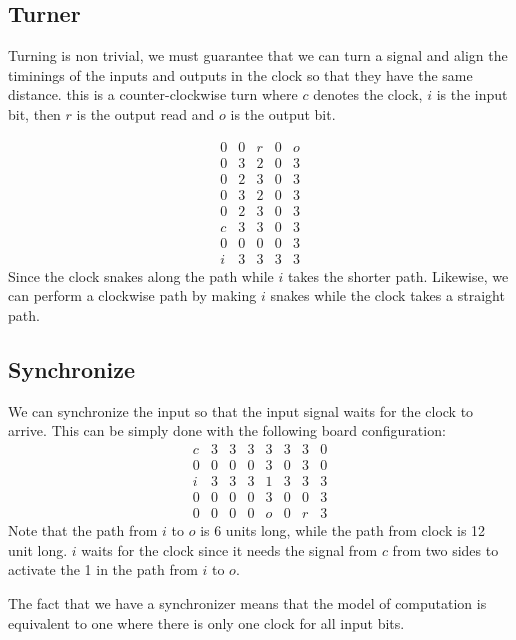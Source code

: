 \documentclass[runningheads,a4paper]{llncs}
\begin{document}
\subsection{Turner}

Turning is non trivial, we must guarantee that we can turn a signal and align the timinings of the inputs and outputs in the clock so that they have the same distance. this is a counter-clockwise turn where $c$ denotes the clock, $i$ is the input bit, then $r$ is the output read and $o$ is the output bit.

\[ \begin{array}{cccccc} 0 & 0 & r & 0 & o \\
				     0 & 3 & 2 & 0 & 3 \\
			            0 & 2 & 3 & 0 & 3 \\
				    0 & 3 & 2 & 0 & 3 \\
				    0 & 2 & 3 & 0 & 3 \\
				    c & 3 & 3 & 0 & 3 \\
				    0 & 0 & 0 & 0 & 3 \\
				    i & 3 & 3 & 3 & 3 \end{array} \]	
Since the clock snakes along the path while $i$ takes the shorter path. 
Likewise, we can perform a clockwise path by making $i$ snakes while the clock takes a straight path. 

\subsection{Synchronize}

We can synchronize the input so that the input signal waits for the clock to arrive. This can be simply done with the following board configuration:
\[ \begin{array}{cccccccc} c & 3 & 3 & 3 & 3 & 3 & 3 & 0 \\
					 0 & 0 & 0 & 0 & 3 & 0 & 3 & 0 \\
					 i  & 3 & 3 & 3 & 1 & 3 & 3 & 3 \\
					 0 & 0 & 0 & 0 & 3 & 0 & 0 & 3 \\
					 0 & 0 & 0 & 0 & o & 0 & r & 3 \end{array} \]
Note that the path from $i$ to $o$ is 6 units long, while the path from clock is 12 unit long. $i$ waits for the clock since it needs the signal from $c$ from two sides to activate the 1 in the path from $i$ to $o$.

The fact that we have a synchronizer means that the model of computation is equivalent to one where there is only one clock for all input bits. 
\end{document}
